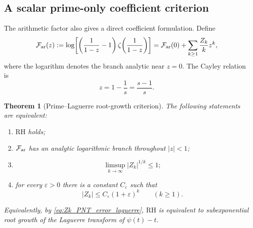 \documentclass[11pt]{amsart}
\numberwithin{equation}{section}
\theoremstyle{plain}
\newtheorem{theorem}{Theorem}[section]
\theoremstyle{definition}
\theoremstyle{remark}
\newcommand{\RH}{\mathrm{RH}}
\begin{document}
\subsection{A scalar prime-only coefficient criterion}

The arithmetic factor also gives a direct coefficient formulation.  Define
\begin{equation}
 \mathcal F_{\rm ar}(z)
 :=\log\!\left[
 \left(\frac{1}{1-z}-1\right)
 \zeta\!\left(\frac{1}{1-z}\right)
 \right]
 =\mathcal F_{\rm ar}(0)
 +\sum_{k\ge1}\frac{Z_k}{k}z^k,
 \label{eq:Far_generating_Zk}
\end{equation}
where the logarithm denotes the branch analytic near $z=0$.  The Cayley relation is
\begin{equation}
 z=1-\frac1s=\frac{s-1}{s}.
 \label{eq:z_Cayley_again}
\end{equation}

\begin{theorem}[Prime--Laguerre root-growth criterion]
\label{thm:prime_laguerre_RH_criterion}
The following statements are equivalent:
\begin{enumerate}[label=(\roman*)]
\item $\RH$ holds;
\item $\mathcal F_{\rm ar}$ has an analytic logarithmic branch throughout $|z|<1$;
\item
\begin{equation}
 \boxed{
 \limsup_{k\to\infty}|Z_k|^{1/k}\le1;}
 \label{eq:Zk_root_growth_RH}
\end{equation}
\item for every $\varepsilon>0$ there is a constant $C_\varepsilon$ such that
\begin{equation}
 |Z_k|\le C_\varepsilon(1+\varepsilon)^k
 \qquad(k\ge1).
 \label{eq:Zk_subexponential_bound}
\end{equation}
\end{enumerate}
Equivalently, by \eqref{eq:Zk_PNT_error_laguerre}, $\RH$ is equivalent to subexponential root growth of the Laguerre transform of $\psi(t)-t$.
\end{theorem}
\end{document}
